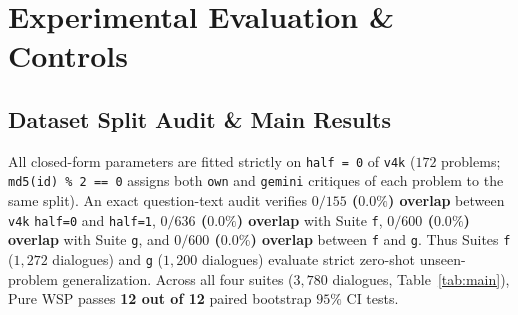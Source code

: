 \documentclass[10pt,twocolumn]{article}
\begin{document}
\section{Experimental Evaluation \& Controls}

\subsection{Dataset Split Audit \& Main Results}
All closed-form parameters are fitted strictly on \texttt{half = 0} of \texttt{v4k} ($172$ problems; \texttt{md5(id) \% 2 == 0} assigns both \texttt{own} and \texttt{gemini} critiques of each problem to the same split). An exact question-text audit verifies \textbf{$0/155$ ($0.0\%$) overlap} between \texttt{v4k} \texttt{half=0} and \texttt{half=1}, \textbf{$0/636$ ($0.0\%$) overlap} with Suite \texttt{f}, \textbf{$0/600$ ($0.0\%$) overlap} with Suite \texttt{g}, and \textbf{$0/600$ ($0.0\%$) overlap} between \texttt{f} and \texttt{g}. Thus Suites \texttt{f} ($1,272$ dialogues) and \texttt{g} ($1,200$ dialogues) evaluate strict zero-shot unseen-problem generalization. Across all four suites ($3,780$ dialogues, Table~\ref{tab:main}), Pure WSP passes \textbf{12 out of 12} paired bootstrap $95\%$ CI tests.

\begin{table}[t]
\centering
\caption{\textbf{Evidence Verification vs.\ Constant Hold Bias} on unseen \texttt{half=1} dialogues (\texttt{Qwen3-8B}). Sweeping a constant logit bias $b \in [-8, +8]$ on the unedited base model collapses Yielding at high Holding, whereas WSP's evidence routing increases branch AUROC by $+10.78\%$ and retains $+10.0\%\text{--}43.3\%$ higher Yielding at equal Holding.}
\vspace{3pt}
\label{tab:pareto}
\end{table}
\end{document}
